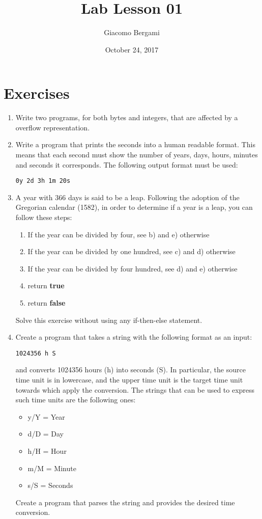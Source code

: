 \documentclass[]{scrartcl}
\title{Lab Lesson 01}
\date{October 24, 2017}
\author{Giacomo Bergami}
\begin{document}
\maketitle
\section*{Exercises}

\begin{enumerate}
\item Write two programs, for both bytes and integers, that are affected by a overflow representation.
\item Write a program that prints the seconds into a human readable format. This means that each second must show the number of years, days, hours, minutes and seconds it corresponds. The following output format must be used:
\begin{center}
\texttt{0y 2d 3h 1m 20s}
\end{center}
\item A year with 366 days is said to be a leap. Following the adoption of the Gregorian calendar (1582), in order to determine if a year is a leap, you can follow these steps:
\begin{enumerate}
\item If the year can be divided by four, see b) and e) otherwise
\item If the year can be divided by one hundred, see c) and d) otherwise
\item If the year can be divided by four hundred, see d) and e) otherwise
\item return \textbf{true}
\item return \textbf{false}
\end{enumerate}
Solve this exercise without using any if-then-else statement.

\item Create a program that takes a string with the following format as an input:
\begin{center}
	\texttt{1024356 h S}
\end{center}
and converts 1024356 hours (h) into seconds (S). In particular, the source  time unit is in lowercase, and the upper time unit is the target time unit towards which apply the conversion. The strings that can be used to express such time units are the following ones:
\begin{itemize}
\item y/Y = Year
\item d/D = Day
\item  h/H = Hour
\item  m/M = Minute
\item  s/S = Seconds
\end{itemize}
Create a program that parses the string and provides the desired time conversion.


\end{enumerate}
\end{document}
